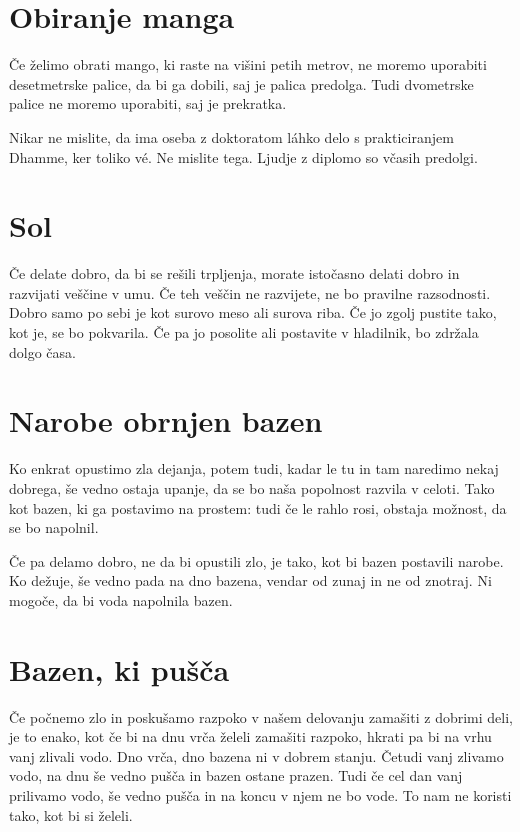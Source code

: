 \section{Obiranje manga}

Če želimo obrati mango, ki raste na višini petih metrov, ne moremo uporabiti desetmetrske palice, da bi ga dobili, saj je palica predolga. Tudi dvometrske palice ne moremo uporabiti, saj je prekratka.

Nikar ne mislite, da ima oseba z doktoratom láhko delo s prakticiranjem Dhamme, ker toliko vé. Ne mislite tega. Ljudje z diplomo so včasih predolgi.

\section{Sol}

Če delate dobro, da bi se rešili trpljenja, morate istočasno delati dobro in razvijati veščine v umu. Če teh veščin ne razvijete, ne bo pravilne  razsodnosti. Dobro samo po sebi je kot surovo meso ali surova riba. Če jo zgolj pustite tako, kot je, se bo pokvarila. Če pa jo posolite ali postavite v hladilnik, bo zdržala dolgo časa.

\section{Narobe obrnjen bazen}

Ko enkrat opustimo zla dejanja, potem tudi, kadar le tu in tam naredimo nekaj dobrega, še vedno ostaja upanje, da se bo naša popolnost razvila v celoti. Tako kot bazen, ki ga postavimo na prostem: tudi če le rahlo rosi, obstaja možnost, da se bo napolnil.

Če pa delamo dobro, ne da bi opustili zlo, je tako, kot bi bazen postavili narobe. Ko dežuje, še vedno pada na dno bazena, vendar od zunaj in ne od znotraj. Ni mogoče, da bi voda napolnila bazen.

\section{Bazen, ki pušča}

Če počnemo zlo in poskušamo razpoko v našem delovanju zamašiti z dobrimi deli, je to enako, kot če bi na dnu vrča želeli zamašiti razpoko, hkrati pa bi na vrhu vanj zlivali vodo. Dno vrča, dno bazena ni v dobrem stanju. Četudi vanj zlivamo vodo, na dnu še vedno pušča in bazen ostane prazen. Tudi če cel dan vanj prilivamo vodo, še vedno pušča in na koncu v njem ne bo vode. To nam ne koristi tako, kot bi si želeli.

